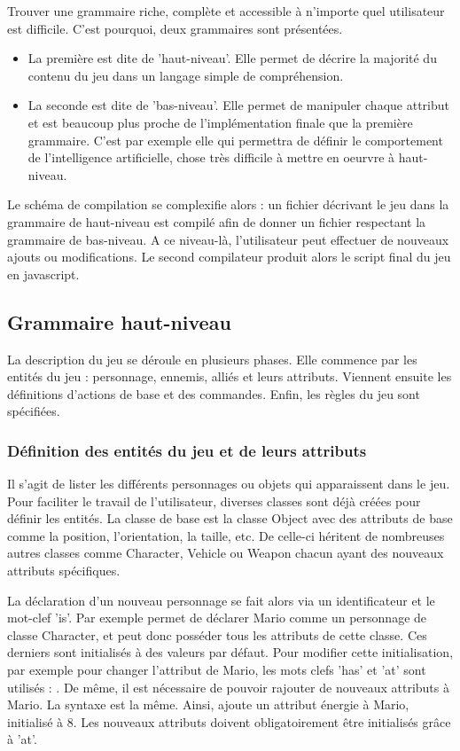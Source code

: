 Trouver une grammaire riche, complète et accessible à n'importe quel utilisateur est difficile.
C'est pourquoi, deux grammaires sont présentées.

\begin{itemize}
 \item La première est dite de 'haut-niveau'.
Elle permet de décrire la majorité du contenu du jeu dans un langage simple de compréhension.
 \item La seconde est dite de 'bas-niveau'.
Elle permet de manipuler chaque attribut et est beaucoup plus proche de l'implémentation finale que la première grammaire.
C'est par exemple elle qui permettra de définir le comportement de l'intelligence artificielle, chose très difficile à mettre en oeurvre à haut-niveau.
\end{itemize}

Le schéma de compilation se complexifie alors : un fichier décrivant le jeu dans la grammaire de haut-niveau est compilé afin de donner un fichier
respectant la grammaire de bas-niveau. A ce niveau-là, l'utilisateur peut effectuer de nouveaux ajouts ou modifications. Le second compilateur
produit alors le script final du jeu en javascript.

\subsection{Grammaire haut-niveau}

La description du jeu se déroule en plusieurs phases.
Elle commence par les entités du jeu : personnage, ennemis, alliés et leurs attributs.
Viennent ensuite les définitions d'actions de base et des commandes.
Enfin, les règles du jeu sont spécifiées.

\subsubsection{Définition des entités du jeu et de leurs attributs}

Il s'agit de lister les différents personnages ou objets qui apparaissent dans le jeu.
Pour faciliter le travail de l'utilisateur, diverses classes sont déjà créées pour définir les entités.
La classe de base est la classe Object avec des attributs de base comme la position, l'orientation, la taille, etc.
De celle-ci héritent de nombreuses autres classes comme Character, Vehicle ou Weapon chacun ayant des nouveaux attributs spécifiques.

La déclaration d'un nouveau personnage se fait alors via un identificateur et le mot-clef 'is'.
Par exemple  permet de déclarer Mario comme un personnage de classe Character, 
et peut donc posséder tous les attributs de cette classe. Ces derniers sont initialisés à des valeurs par défaut.
Pour modifier cette initialisation, par exemple pour changer l'attribut  de Mario, les mots clefs 'has' et 'at' sont utilisés : 
.
De même, il est nécessaire de pouvoir rajouter de nouveaux attributs à Mario.
La syntaxe est la même. Ainsi,  ajoute un attribut énergie à Mario, initialisé à 8.
Les nouveaux attributs doivent obligatoirement être initialisés grâce à 'at'.

